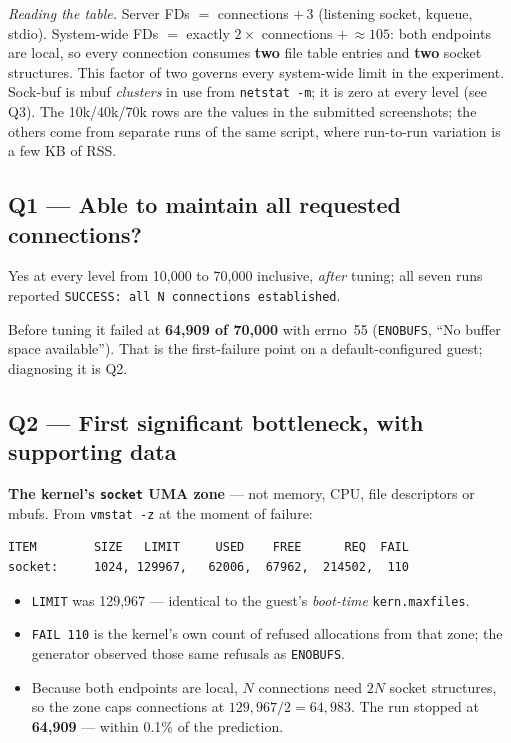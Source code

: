 \documentclass[11pt,a4paper]{article}
\newcommand{\cmd}[1]{\texttt{\small #1}}
\begin{document}
\emph{Reading the table.} Server FDs $=$ connections $+\,3$ (listening socket,
kqueue, stdio). System-wide FDs $=$ exactly $2\times$ connections $+\,{\approx}105$:
both endpoints are local, so every connection consumes \textbf{two} file table
entries and \textbf{two} socket structures. This factor of two governs every
system-wide limit in the experiment. Sock-buf is mbuf \emph{clusters} in use
from \cmd{netstat -m}; it is zero at every level (see Q3). The 10k/40k/70k rows
are the values in the submitted screenshots; the others come from separate runs
of the same script, where run-to-run variation is a few KB of RSS.

\subsection{Q1 --- Able to maintain all requested connections?}

Yes at every level from 10{,}000 to 70{,}000 inclusive, \emph{after} tuning; all
seven runs reported \cmd{SUCCESS: all N connections established}.

Before tuning it failed at \textbf{64{,}909 of 70{,}000} with errno~55
(\cmd{ENOBUFS}, ``No buffer space available''). That is the first-failure point
on a default-configured guest; diagnosing it is Q2.

\subsection{Q2 --- First significant bottleneck, with supporting data}
\label{sec:tuple}

\textbf{The kernel's \cmd{socket} UMA zone} --- not memory, CPU, file
descriptors or mbufs. From \cmd{vmstat -z} at the moment of failure:

\begin{Verbatim}[fontsize=\small,frame=single]
ITEM        SIZE   LIMIT     USED    FREE      REQ  FAIL
socket:     1024, 129967,   62006,  67962,  214502,  110
\end{Verbatim}

\begin{itemize}\itemsep2pt
\item \cmd{LIMIT} was 129{,}967 --- identical to the guest's \emph{boot-time}
      \cmd{kern.maxfiles}.
\item \cmd{FAIL 110} is the kernel's own count of refused allocations from that
      zone; the generator observed those same refusals as \cmd{ENOBUFS}.
\item Because both endpoints are local, $N$ connections need $2N$ socket
      structures, so the zone caps connections at $129{,}967/2 = 64{,}983$. The
      run stopped at \textbf{64{,}909} --- within 0.1\% of the prediction.
\end{itemize}
\end{document}
